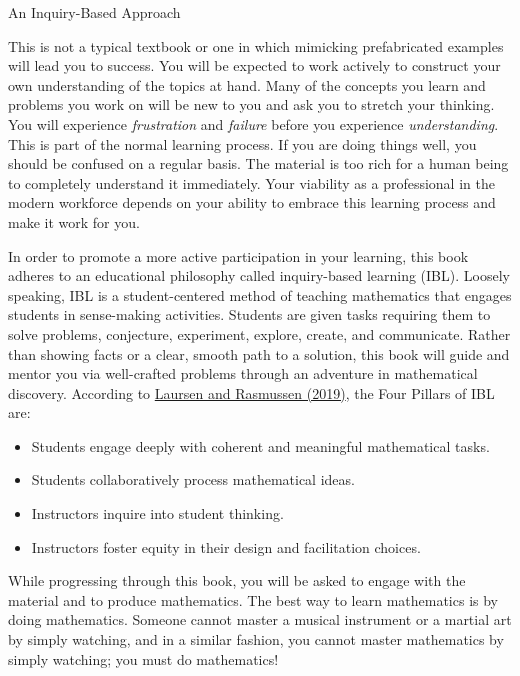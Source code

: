 \begin{section}{An Inquiry-Based Approach}

This is not a typical textbook or one in which mimicking prefabricated examples will lead you to success. You will be expected to work actively to construct your own understanding of the topics at hand. 
Many of the concepts you learn and problems you work on will be new to you and ask you to stretch your thinking. You will experience \emph{frustration} and \emph{failure} before you experience \emph{understanding}. This is part of the normal learning process. If you are doing things well, you should be confused on a regular basis. The material is too rich for a human being to completely understand it immediately. Your viability as a professional in the modern workforce depends on your ability to embrace this learning process and make it work for you.

In order to promote a more active participation in your learning, this book adheres to an educational philosophy called inquiry-based learning (IBL).  Loosely speaking, IBL is a student-centered method of teaching mathematics that engages students in sense-making activities.  Students are given tasks requiring them to solve problems, conjecture, experiment, explore, create, and communicate.  Rather than showing facts or a clear, smooth path to a solution, this book will guide and mentor you via well-crafted problems through an adventure in mathematical discovery.  According to \href{https://www.colorado.edu/eer/sites/default/files/attached-files/laursenrasmussencommentaryauthorversion0219.pdf}{Laursen and Rasmussen (2019)}, the Four Pillars of IBL are:
\begin{itemize}
\item Students engage deeply with coherent and meaningful mathematical tasks.
\item Students collaboratively process mathematical ideas.
\item Instructors inquire into student thinking.
\item Instructors foster equity in their design and facilitation choices.
\end{itemize}

While progressing through this book, you will be asked to engage with the material and to produce mathematics. The best way to learn mathematics is by doing mathematics.  Someone cannot master a musical instrument or a martial art by simply watching, and in a similar fashion, you cannot master mathematics by simply watching; you must do mathematics!


\end{section}
